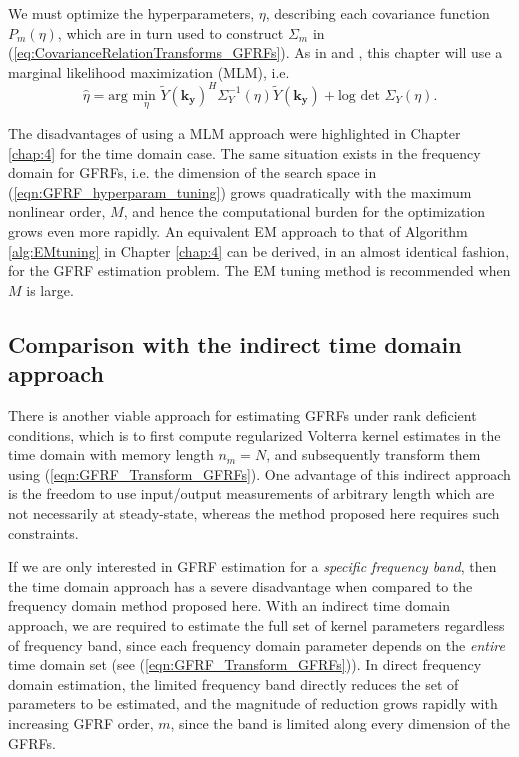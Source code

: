 We must optimize the hyperparameters, $\eta$, describing each covariance function $P_m(\eta)$, which are in turn used to construct $\Sigma_m$ in (\ref{eq:CovarianceRelationTransforms_GFRFs}). As in \cite{Birpoutsoukis2017} and \cite{Lataire2016}, this chapter will use a marginal likelihood maximization (MLM), i.e.
\begin{equation}
\label{eqn:GFRF_hyperparam_tuning}
\hat{\eta} = \text{arg } \underset{\eta}{\text{min }} \widetilde{Y}(\mathbf{k_y})^H \Sigma_Y^{-1}(\eta) \widetilde{Y}(\mathbf{k_y}) + \text{log det } \Sigma_Y(\eta).
\end{equation}

\begin{rem}
The disadvantages of using a MLM approach were highlighted in Chapter \ref{chap:4} for the time domain case. The same situation exists in the frequency domain for GFRFs, i.e. the dimension of the search space in (\ref{eqn:GFRF_hyperparam_tuning}) grows quadratically with the maximum nonlinear order, $M$, and hence the computational burden for the optimization grows even more rapidly. An equivalent EM approach to that of Algorithm \ref{alg:EMtuning} in Chapter \ref{chap:4} can be derived, in an almost identical fashion, for the GFRF estimation problem. The EM tuning method is recommended when $M$ is large.
\end{rem}

\subsection{Comparison with the indirect time domain approach}
\label{sec:FDvsTD_GFRFs}

There is another viable approach for estimating GFRFs under rank deficient conditions, which is to first compute regularized Volterra kernel estimates in the time domain with memory length $n_m = N$, and subsequently transform them using (\ref{eqn:GFRF_Transform_GFRFs}). One advantage of this indirect approach is the freedom to use input/output measurements of arbitrary length which are not necessarily at steady-state, whereas the method proposed here requires such constraints. 

If we are only interested in GFRF estimation for a \emph{specific frequency band}, then the time domain approach has a severe disadvantage when compared to the frequency domain method proposed here. With an indirect time domain approach, we are required to estimate the full set of kernel parameters regardless of frequency band, since each frequency domain parameter depends on the \emph{entire} time domain set (see (\ref{eqn:GFRF_Transform_GFRFs})). In direct frequency domain estimation, the limited frequency band directly reduces the set of parameters to be estimated, and the magnitude of reduction grows rapidly with increasing GFRF order, $m$, since the band is limited along every dimension of the GFRFs. 

